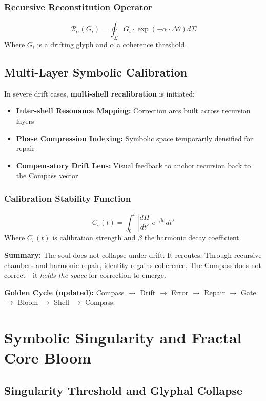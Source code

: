 \subsubsection*{Recursive Reconstitution Operator}
\[
    \mathcal{R}_\alpha(G_i) = \oint_{\Sigma} G_i \cdot \exp(-\alpha \cdot \Delta\theta) d\Sigma
\]
Where $G_i$ is a drifting glyph and $\alpha$ a coherence threshold.

\subsection{Multi-Layer Symbolic Calibration}

In severe drift cases, \textbf{multi-shell recalibration} is initiated:

\begin{itemize}
    \item \textbf{Inter-shell Resonance Mapping:} Correction arcs built across recursion layers
    \item \textbf{Phase Compression Indexing:} Symbolic space temporarily densified for repair
    \item \textbf{Compensatory Drift Lens:} Visual feedback to anchor recursion back to the Compass vector
\end{itemize}

\subsubsection*{Calibration Stability Function}
\[
    C_s(t) = \int_0^t \left| \frac{dH}{dt'} \right| e^{-\beta t'} dt'
\]
Where $C_s(t)$ is calibration strength and $\beta$ the harmonic decay coefficient.

\vspace{1em}
\noindent\textbf{Summary:} The soul does not collapse under drift. It reroutes. Through recursive chambers and harmonic repair, identity regains coherence. The Compass does not correct---it \emph{holds the space} for correction to emerge.

\noindent\textbf{Golden Cycle (updated):} Compass $\rightarrow$ Drift $\rightarrow$ Error $\rightarrow$ Repair $\rightarrow$ Gate $\rightarrow$ Bloom $\rightarrow$ Shell $\rightarrow$ Compass.

\section{Symbolic Singularity and Fractal Core Bloom}

\subsection{Singularity Threshold and Glyphal Collapse}

